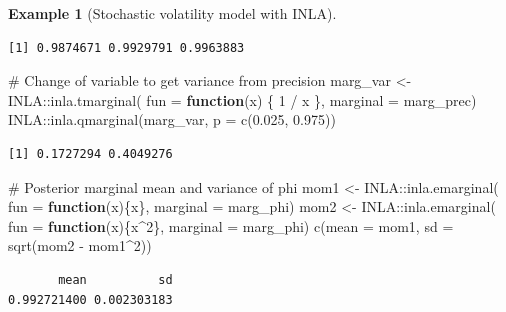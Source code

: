 \documentclass[
  11pt,
  letterpaper,
]{scrbook}
\newenvironment{Shaded}{\begin{snugshade}}{\end{snugshade}}
\newcommand{\AttributeTok}[1]{\textcolor[rgb]{0.40,0.45,0.13}{#1}}
\newcommand{\CommentTok}[1]{\textcolor[rgb]{0.37,0.37,0.37}{#1}}
\newcommand{\ControlFlowTok}[1]{\textcolor[rgb]{0.00,0.23,0.31}{\textbf{#1}}}
\newcommand{\DecValTok}[1]{\textcolor[rgb]{0.68,0.00,0.00}{#1}}
\newcommand{\FloatTok}[1]{\textcolor[rgb]{0.68,0.00,0.00}{#1}}
\newcommand{\FunctionTok}[1]{\textcolor[rgb]{0.28,0.35,0.67}{#1}}
\newcommand{\NormalTok}[1]{\textcolor[rgb]{0.00,0.23,0.31}{#1}}
\newcommand{\OtherTok}[1]{\textcolor[rgb]{0.00,0.23,0.31}{#1}}
\newcommand{\SpecialCharTok}[1]{\textcolor[rgb]{0.37,0.37,0.37}{#1}}
\theoremstyle{definition}
\theoremstyle{definition}
\newtheorem{example}{Example}[chapter]
\theoremstyle{definition}
\theoremstyle{plain}
\theoremstyle{plain}
\theoremstyle{plain}
\theoremstyle{remark}
\begin{document}
\begin{example}[Stochastic volatility model with
INLA]
\begin{verbatim}
[1] 0.9874671 0.9929791 0.9963883
\end{verbatim}

\begin{Shaded}
\begin{Highlighting}[]
\CommentTok{\# Change of variable to get variance from precision}
\NormalTok{marg\_var }\OtherTok{\textless{}{-}}\NormalTok{ INLA}\SpecialCharTok{::}\FunctionTok{inla.tmarginal}\NormalTok{(}
  \AttributeTok{fun =} \ControlFlowTok{function}\NormalTok{(x) \{ }\DecValTok{1} \SpecialCharTok{/}\NormalTok{ x \}, }
  \AttributeTok{marginal =}\NormalTok{ marg\_prec)}
\NormalTok{INLA}\SpecialCharTok{::}\FunctionTok{inla.qmarginal}\NormalTok{(marg\_var, }\AttributeTok{p =} \FunctionTok{c}\NormalTok{(}\FloatTok{0.025}\NormalTok{, }\FloatTok{0.975}\NormalTok{))}
\end{Highlighting}
\end{Shaded}

\begin{verbatim}
[1] 0.1727294 0.4049276
\end{verbatim}

\begin{Shaded}
\begin{Highlighting}[]
\CommentTok{\# Posterior marginal mean and variance of phi}
\NormalTok{mom1 }\OtherTok{\textless{}{-}}\NormalTok{ INLA}\SpecialCharTok{::}\FunctionTok{inla.emarginal}\NormalTok{(}
    \AttributeTok{fun =} \ControlFlowTok{function}\NormalTok{(x)\{x\}, }
    \AttributeTok{marginal =}\NormalTok{ marg\_phi)}
\NormalTok{mom2 }\OtherTok{\textless{}{-}}\NormalTok{ INLA}\SpecialCharTok{::}\FunctionTok{inla.emarginal}\NormalTok{(}
    \AttributeTok{fun =} \ControlFlowTok{function}\NormalTok{(x)\{x}\SpecialCharTok{\^{}}\DecValTok{2}\NormalTok{\}, }
    \AttributeTok{marginal =}\NormalTok{ marg\_phi)}
\FunctionTok{c}\NormalTok{(}\AttributeTok{mean =}\NormalTok{ mom1, }\AttributeTok{sd =} \FunctionTok{sqrt}\NormalTok{(mom2 }\SpecialCharTok{{-}}\NormalTok{ mom1}\SpecialCharTok{\^{}}\DecValTok{2}\NormalTok{))}
\end{Highlighting}
\end{Shaded}

\begin{verbatim}
       mean          sd 
0.992721400 0.002303183 
\end{verbatim}

\end{example}
\end{document}
